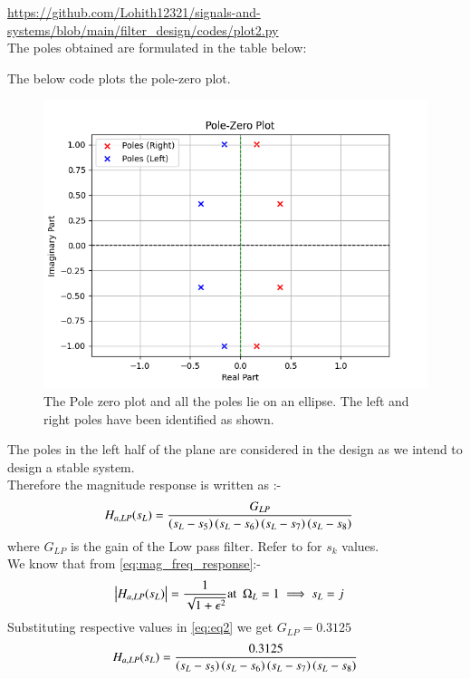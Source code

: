 \documentclass{article}
\begin{document}
\begin{itemize}
\href{https://github.com/Lohith12321/signals-and-systems/blob/main/filter_design/codes/plot2.py}{https://github.com/Lohith12321/signals-and-systems/blob/main/filter_design/codes/plot2.py}\\
The poles obtained are formulated in the table below:

The below code plots the pole-zero plot.
\begin{figure}[H]
\centering
\includegraphics[width=1\columnwidth]{figs/Plot2.png}
\caption{The Pole zero plot and all the poles lie on an ellipse. The left and right poles have been identified as shown.}
\label{fig:plot2}
\end{figure}
The poles in the left half of the plane are considered in the design as we intend to design a stable system.\\
Therefore the magnitude response is written as :- 
\begin{align}
    H_{a,LP}(s_L) &= \frac{G_{LP}}{\left(s_L-s_5\right)\left(s_L-s_6\right)\left(s_L-s_7\right)\left(s_L-s_8\right)}
\end{align}
where $G_{LP}$ is the gain of the Low pass filter. Refer to  for $s_k$ values.\\
We know that from \eqref{eq:mag_freq_response}:-
\begin{align}
    \left\vert H_{a,LP}(s_L)\right\vert &= \frac{1}{\sqrt{1+\epsilon^2}} \text{at} \hspace{5pt} \Omega_{L}=1 \implies s_{L} = j \label{eq:eq2} 
\end{align}
Substituting respective values in \eqref{eq:eq2} we get $G_{LP}=0.3125$
\begin{align}
     H_{a,LP}(s_L) &= \frac{0.3125}{\brak{s_L-s_5}\brak{s_L-s_6}\brak{s_L-s_7}\brak{s_L-s_8}}\\

\end{align}
\end{itemize}
\end{document}
